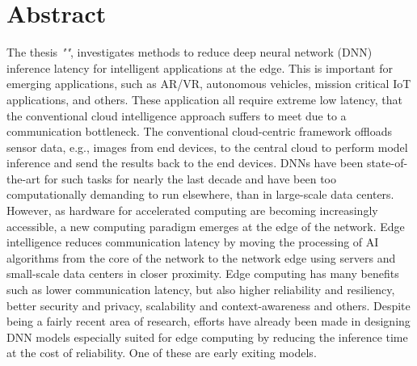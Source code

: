 
    \hypertarget{abstract}{%
    \chapter*{Abstract}\label{sec:abstract}}
    \small{\textcolor{caption-color}{The thesis \textit{"\thetitle"}, investigates methods to reduce deep neural network (DNN) inference latency for intelligent applications at the edge. This is important for emerging applications, such as AR/VR, autonomous vehicles, mission critical IoT applications, and others. These application all require extreme low latency, that the conventional cloud intelligence approach suffers to meet due to a communication bottleneck. The conventional cloud-centric framework offloads sensor data, e.g., images from end devices, to the central cloud to perform model inference and send the results back to the end devices. DNNs have been state-of-the-art for such tasks for nearly the last decade and have been too computationally demanding to run elsewhere, than in large-scale data centers. However, as hardware for accelerated computing are becoming increasingly accessible, a new computing paradigm emerges at the edge of the network.
    \newline\noindent Edge intelligence reduces communication latency by moving the processing of AI algorithms from the core of the network to the network edge using servers and small-scale data centers in closer proximity. Edge computing has many benefits such as lower communication latency, but also higher reliability and resiliency, better security and privacy, scalability and context-awareness and others. Despite being a fairly recent area of research, efforts have already been made in designing DNN models especially suited for edge computing by reducing the inference time at the cost of reliability. One of these are early exiting models.
}}
